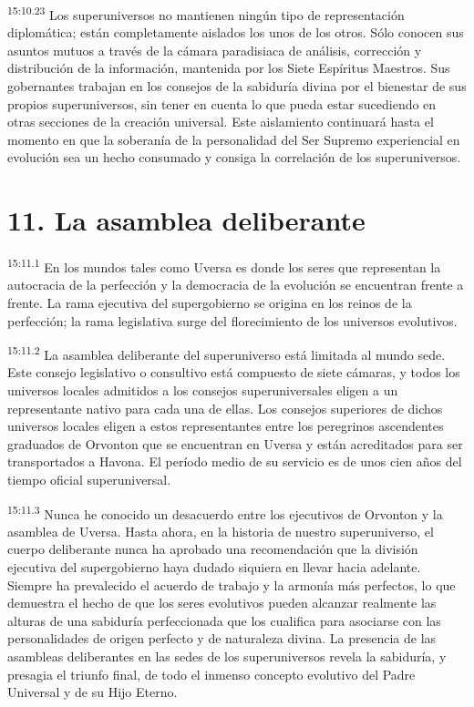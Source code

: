 \par
\textsuperscript{15:10.23} Los superuniversos no mantienen ningún tipo de representación diplomática; están completamente aislados los unos de los otros. Sólo conocen sus asuntos mutuos a través de la cámara paradisiaca de análisis, corrección y distribución de la información, mantenida por los Siete Espíritus Maestros. Sus gobernantes trabajan en los consejos de la sabiduría divina por el bienestar de sus propios superuniversos, sin tener en cuenta lo que pueda estar sucediendo en otras secciones de la creación universal. Este aislamiento continuará hasta el momento en que la soberanía de la personalidad del Ser Supremo experiencial en evolución sea un hecho consumado y consiga la correlación de los superuniversos.

\section*{11. La asamblea deliberante}
\par
\textsuperscript{15:11.1} En los mundos tales como Uversa es donde los seres que representan la autocracia de la perfección y la democracia de la evolución se encuentran frente a frente. La rama ejecutiva del supergobierno se origina en los reinos de la perfección; la rama legislativa surge del florecimiento de los universos evolutivos.

\par
\textsuperscript{15:11.2} La asamblea deliberante del superuniverso está limitada al mundo sede. Este consejo legislativo o consultivo está compuesto de siete cámaras, y todos los universos locales admitidos a los consejos superuniversales eligen a un representante nativo para cada una de ellas. Los consejos superiores de dichos universos locales eligen a estos representantes entre los peregrinos ascendentes graduados de Orvonton que se encuentran en Uversa y están acreditados para ser transportados a Havona. El período medio de su servicio es de unos cien años del tiempo oficial superuniversal.

\par
\textsuperscript{15:11.3} Nunca he conocido un desacuerdo entre los ejecutivos de Orvonton y la asamblea de Uversa. Hasta ahora, en la historia de nuestro superuniverso, el cuerpo deliberante nunca ha aprobado una recomendación que la división ejecutiva del supergobierno haya dudado siquiera en llevar hacia adelante. Siempre ha prevalecido el acuerdo de trabajo y la armonía más perfectos, lo que demuestra el hecho de que los seres evolutivos pueden alcanzar realmente las alturas de una sabiduría perfeccionada que los cualifica para asociarse con las personalidades de origen perfecto y de naturaleza divina. La presencia de las asambleas deliberantes en las sedes de los superuniversos revela la sabiduría, y presagia el triunfo final, de todo el inmenso concepto evolutivo del Padre Universal y de su Hijo Eterno.

